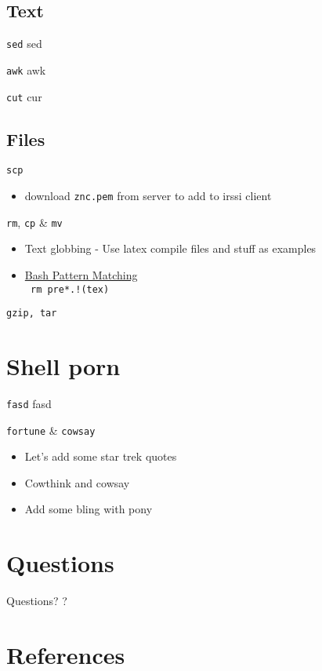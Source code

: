 \documentclass[11pt]{beamer}
\begin{document}
		\subsection{Text}
			\begin{frame}{ \texttt{sed}}
				sed
			\end{frame}
			\begin{frame}{ \texttt{awk}}
				awk
			\end{frame}
			\begin{frame}{ \texttt{cut}}
				cur
			\end{frame}
		\subsection{Files}
			\begin{frame}{ \texttt{scp}}
				\begin{itemize}
					\item download \texttt{znc.pem} from server to add to irssi client
				\end{itemize}			
			\end{frame}
			\begin{frame}{ \texttt{rm}, \texttt{cp} \& \texttt{mv}}
				\begin{itemize}
					\item Text globbing - Use latex compile files and stuff as examples
					\item \href{https://www.gnu.org/software/bash/manual/bashref.html#Pattern-Matching}{Bash Pattern Matching} \\
						\texttt{ rm pre*.!(tex) }
				\end{itemize}	
			\end{frame}
			\begin{frame}{ \texttt{gzip, tar}}
				
			\end{frame}

	\section{Shell porn}
		\begin{frame}{\texttt{fasd}}
			fasd
		\end{frame}
		\begin{frame}{\texttt{fortune} \& \texttt{cowsay}}
			\begin{itemize}
				\item Let's add some star trek quotes
				\item Cowthink and cowsay
				\item Add some bling with pony
			\end{itemize}
		\end{frame}

	\section{Questions}
		\begin{frame}{Questions?}
			\large ?
		\end{frame}

	\section*{References}
		\begin{frame}{References}
			\texttt{\}
		\end{frame}
\end{document}
